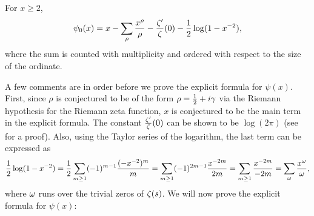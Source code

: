     \begin{theorem*}
      For $x \ge 2$,
      \[
        \psi_{0}(x) = x-\sum_{\rho}\frac{x^{\rho}}{\rho}-\frac{\zeta'}{\zeta}(0)-\frac{1}{2}\log(1-x^{-2}),
      \]
      where the sum is counted with multiplicity and ordered with respect to the size of the ordinate.
    \end{theorem*}

    A few comments are in order before we prove the explicit formula for $\psi(x)$. First, since $\rho$ is conjectured to be of the form $\rho = \frac{1}{2}+i\gamma$ via the Riemann hypothesis for the Riemann zeta function, $x$ is conjectured to be the main term in the explicit formula. The constant $\frac{\zeta'}{\zeta}(0)$ can be shown to be $\log(2\pi)$ (see \cite{davenport1980multiplicative} for a proof). Also, using the Taylor series of the logarithm, the last term can be expressed as
    \[
      \frac{1}{2}\log(1-x^{-2}) = \frac{1}{2}\sum_{m \ge 1}(-1)^{m-1}\frac{(-x^{-2})^{m}}{m} = \sum_{m \ge 1}(-1)^{2m-1}\frac{x^{-2m}}{2m} = \sum_{m \ge 1}\frac{x^{-2m}}{-2m} = \sum_{\omega}\frac{x^{\omega}}{\omega},
    \]
    where $\omega$ runs over the trivial zeros of $\zeta(s)$. We will now prove the explicit formula for $\psi(x)$:

